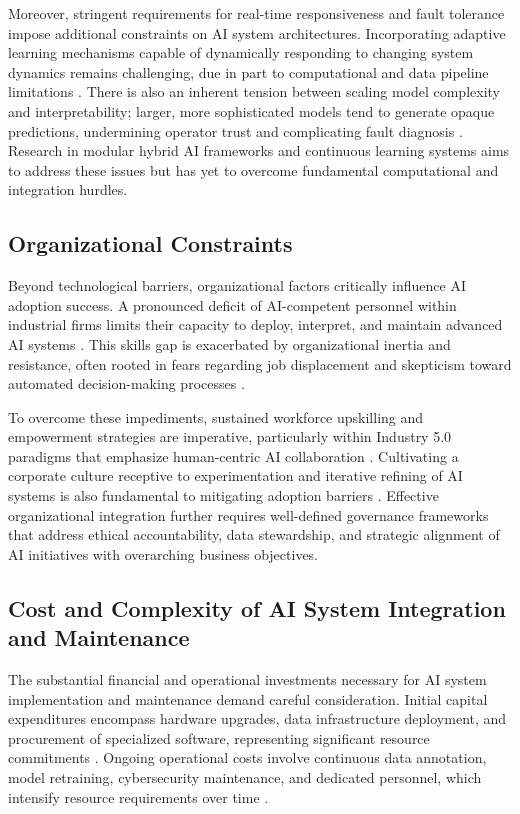 \documentclass[sigconf]{acmart}
\begin{document}
Moreover, stringent requirements for real-time responsiveness and fault tolerance impose additional constraints on AI system architectures. Incorporating adaptive learning mechanisms capable of dynamically responding to changing system dynamics remains challenging, due in part to computational and data pipeline limitations \cite{ref31,ref32}. There is also an inherent tension between scaling model complexity and interpretability; larger, more sophisticated models tend to generate opaque predictions, undermining operator trust and complicating fault diagnosis \cite{ref2}. Research in modular hybrid AI frameworks and continuous learning systems aims to address these issues but has yet to overcome fundamental computational and integration hurdles.

\subsection{Organizational Constraints}

Beyond technological barriers, organizational factors critically influence AI adoption success. A pronounced deficit of AI-competent personnel within industrial firms limits their capacity to deploy, interpret, and maintain advanced AI systems \cite{ref7,ref26}. This skills gap is exacerbated by organizational inertia and resistance, often rooted in fears regarding job displacement and skepticism toward automated decision-making processes \cite{ref3,ref26}.

To overcome these impediments, sustained workforce upskilling and empowerment strategies are imperative, particularly within Industry 5.0 paradigms that emphasize human-centric AI collaboration \cite{ref3}. Cultivating a corporate culture receptive to experimentation and iterative refining of AI systems is also fundamental to mitigating adoption barriers \cite{ref26,ref38}. Effective organizational integration further requires well-defined governance frameworks that address ethical accountability, data stewardship, and strategic alignment of AI initiatives with overarching business objectives.

\subsection{Cost and Complexity of AI System Integration and Maintenance}

The substantial financial and operational investments necessary for AI system implementation and maintenance demand careful consideration. Initial capital expenditures encompass hardware upgrades, data infrastructure deployment, and procurement of specialized software, representing significant resource commitments \cite{ref11,ref12,ref35}. Ongoing operational costs involve continuous data annotation, model retraining, cybersecurity maintenance, and dedicated personnel, which intensify resource requirements over time \cite{ref7,ref9,ref20}.
\end{document}

